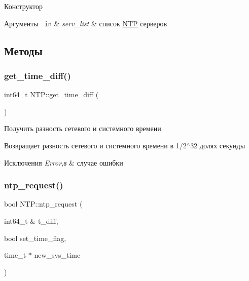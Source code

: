 Конструктор 


\begin{DoxyParams}[1]{Аргументы}
\mbox{\texttt{ in}}  & {\em serv\+\_\+list} & список \mbox{\hyperlink{classNTP}{N\+TP}} серверов \\
\hline
\end{DoxyParams}


\subsection{Методы}
\mbox{\label{classNTP_aadb62dc7f48a7fb76e1ec9d1784e657c}} 
\subsubsection{\texorpdfstring{get\_time\_diff()}{get\_time\_diff()}}
{\footnotesize\ttfamily int64\+\_\+t N\+T\+P\+::get\+\_\+time\+\_\+diff (\begin{DoxyParamCaption}{ }\end{DoxyParamCaption})}



Получить разность сетевого и системного времени 

\begin{DoxyReturn}{Возвращает}
разность сетевого и системного времени в 1/2$^\wedge$32 долях секунды 
\end{DoxyReturn}

\begin{DoxyExceptions}{Исключения}
{\em Error,в} & случае ошибки \\
\hline
\end{DoxyExceptions}
\mbox{\label{classNTP_a685ca56d2db2d35537d267b6e84ba594}} 
\subsubsection{\texorpdfstring{ntp\_request()}{ntp\_request()}}
{\footnotesize\ttfamily bool N\+T\+P\+::ntp\+\_\+request (\begin{DoxyParamCaption}\item[{int64\+\_\+t \&}]{t\+\_\+diff,  }\item[{bool}]{set\+\_\+time\+\_\+flag,  }\item[{time\+\_\+t $\ast$}]{new\+\_\+sys\+\_\+time }\end{DoxyParamCaption})\hspace{0.3cm}{\ttfamily [private]}}



